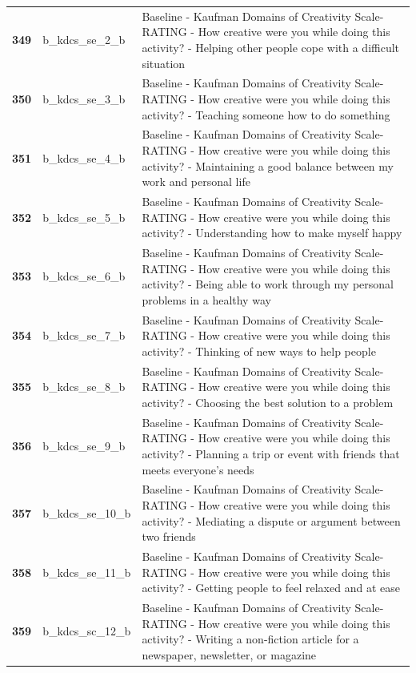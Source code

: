 \documentclass[
  letterpaper,
  DIV=11,
  numbers=noendperiod]{scrartcl}
\begin{document}
\begin{longtable}[t]{>{}cll}
\textbf{349} & b\_kdcs\_se\_2\_b & Baseline - Kaufman Domains of Creativity Scale-RATING - How creative were you while doing this activity? - Helping other people cope with a difficult situation\\
\textbf{350} & b\_kdcs\_se\_3\_b & Baseline - Kaufman Domains of Creativity Scale-RATING - How creative were you while doing this activity? - Teaching someone how to do something\\
\addlinespace
\textbf{351} & b\_kdcs\_se\_4\_b & Baseline - Kaufman Domains of Creativity Scale-RATING - How creative were you while doing this activity? - Maintaining a good balance between my work and personal life\\
\textbf{352} & b\_kdcs\_se\_5\_b & Baseline - Kaufman Domains of Creativity Scale-RATING - How creative were you while doing this activity? - Understanding how to make myself happy\\
\textbf{353} & b\_kdcs\_se\_6\_b & Baseline - Kaufman Domains of Creativity Scale-RATING - How creative were you while doing this activity? - Being able to work through my personal problems in a healthy way\\
\textbf{354} & b\_kdcs\_se\_7\_b & Baseline - Kaufman Domains of Creativity Scale-RATING - How creative were you while doing this activity? - Thinking of new ways to help people\\
\textbf{355} & b\_kdcs\_se\_8\_b & Baseline - Kaufman Domains of Creativity Scale-RATING - How creative were you while doing this activity? - Choosing the best solution to a problem\\
\addlinespace
\textbf{356} & b\_kdcs\_se\_9\_b & Baseline - Kaufman Domains of Creativity Scale-RATING - How creative were you while doing this activity? - Planning a trip or event with friends that meets everyone's needs\\
\textbf{357} & b\_kdcs\_se\_10\_b & Baseline - Kaufman Domains of Creativity Scale-RATING - How creative were you while doing this activity? - Mediating a dispute or argument between two friends\\
\textbf{358} & b\_kdcs\_se\_11\_b & Baseline - Kaufman Domains of Creativity Scale-RATING - How creative were you while doing this activity? - Getting people to feel relaxed and at ease\\
\textbf{359} & b\_kdcs\_sc\_12\_b & Baseline - Kaufman Domains of Creativity Scale-RATING - How creative were you while doing this activity? - Writing a non-fiction article for a newspaper, newsletter, or magazine\\

\end{longtable}
\end{document}
